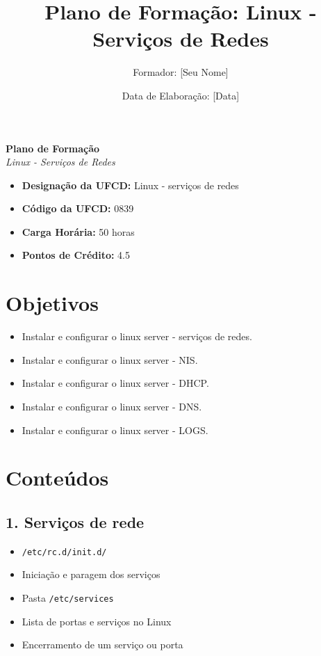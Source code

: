 \documentclass[12pt]{article}
\title{Plano de Formação: Linux - Serviços de Redes}
\author{Formador: [Seu Nome]} %
\date{Data de Elaboração: [Data]} %
\begin{document}
	
	\begin{center}
		\vspace*{2cm}
		{\Huge\bfseries Plano de Formação} \\
		\vspace{0.5cm}
		{\Large\itshape Linux - Serviços de Redes}
		\vspace{2cm}
	\end{center}
	
	\begin{itemize}[leftmargin=*,labelsep=1cm]
		\item \textbf{Designação da UFCD:} Linux - serviços de redes
		\item \textbf{Código da UFCD:} 0839
		\item \textbf{Carga Horária:} 50 horas
		\item \textbf{Pontos de Crédito:} 4.5
	\end{itemize}
	
	\vspace{1cm}
	
	\section*{Objetivos}
	\begin{itemize}
		\item Instalar e configurar o linux server - serviços de redes.
		\item Instalar e configurar o linux server - NIS.
		\item Instalar e configurar o linux server - DHCP.
		\item Instalar e configurar o linux server - DNS.
		\item Instalar e configurar o linux server - LOGS.
	\end{itemize}
	
	\newpage
	
	\section*{Conteúdos}
	
	\subsection*{1. Serviços de rede}
	\begin{itemize}
		\item \texttt{/etc/rc.d/init.d/}
		\item Iniciação e paragem dos serviços
		\item Pasta \texttt{/etc/services}
		\item Lista de portas e serviços no Linux
		\item Encerramento de um serviço ou porta
	\end{itemize}
	
\end{document}
